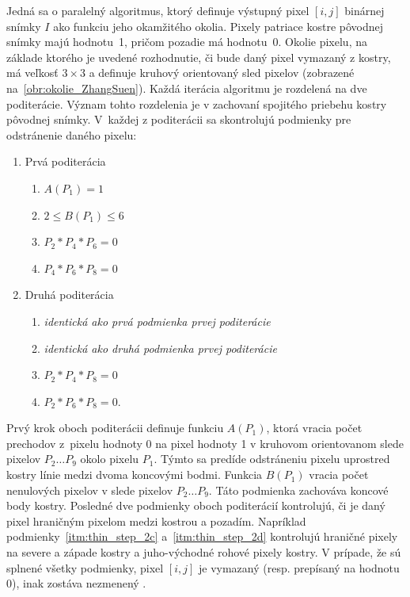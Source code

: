   Jedná sa o paralelný algoritmus, ktorý definuje výstupný pixel $[i,j]$ binárnej snímky $I$ ako funkciu jeho okamžitého okolia. Pixely patriace kostre
  pôvodnej snímky majú hodnotu~1, pričom pozadie má hodnotu~0. Okolie pixelu, na základe ktorého je uvedené rozhodnutie, či bude daný pixel vymazaný z kostry,
  má veľkosť $3 \times 3$ a definuje kruhový orientovaný sled pixelov (zobrazené na~{\ref{obr:okolie_ZhangSuen}}).
  Každá iterácia algoritmu je rozdelená na dve poditerácie. Význam tohto rozdelenia je v zachovaní spojitého priebehu kostry pôvodnej snímky.
  V~každej z poditerácii sa skontrolujú podmienky pre odstránenie daného pixelu:
  \begin{enumerate}
    \item Prvá poditerácia \label{itm:thin_step_1}
    \begin{enumerate}
      \item $A(P_1) = 1$  \label{itm:thin_step_1a}
      \item $2 \leq B(P_1) \leq 6$ \label{itm:thin_step_1b}
      \item $P_2 * P_4 * P_6 = 0$ \label{itm:thin_step_1c}
      \item $P_4 * P_6 * P_8 = 0$ \label{itm:thin_step_1d}
    \end{enumerate}
    \item Druhá poditerácia \label{itm:thin_step_2}
    \begin{enumerate}
      \item \emph{identická ako prvá podmienka prvej poditerácie} \label{itm:thin_step_2a}
      \item \emph{identická ako druhá podmienka prvej poditerácie} \label{itm:thin_step_2b}
      \item $P_2 * P_4 * P_8 = 0$ \label{itm:thin_step_2c}
      \item $P_2 * P_6 * P_8 = 0$. \label{itm:thin_step_2d}
    \end{enumerate}
  \end{enumerate}

  Prvý krok oboch poditerácii definuje funkciu $A(P_1)$, ktorá vracia počet prechodov z~pixelu hodnoty 0 na pixel hodnoty 1 v kruhovom orientovanom slede
  pixelov $P_2\dots{}P_9$ okolo pixelu $P_1$. Týmto sa predíde odstráneniu pixelu uprostred kostry línie medzi dvoma koncovými bodmi.
  Funkcia $B(P_1)$ vracia počet nenulových pixelov v slede pixelov $P_2\dots{}P_9$. Táto podmienka zachováva koncové body
  kostry. Posledné dve podmienky oboch poditerácií kontrolujú, či je daný pixel hraničným pixelom medzi kostrou a pozadím.
  Napríklad podmienky~{\ref{itm:thin_step_2c}} a~{\ref{itm:thin_step_2d}} kontrolujú hraničné pixely na severe a západe kostry a juho-východné rohové pixely
  kostry. V prípade, že sú splnené všetky podmienky, pixel $[i,j]$ je vymazaný (resp. prepísaný na hodnotu 0), inak zostáva nezmenený \cite{ZhangSuen_thinning}.

